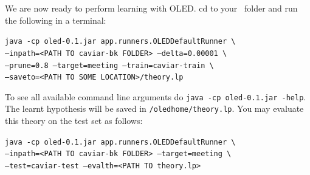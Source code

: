 \documentclass[a4paper,twoside,11pt]{article}
\theoremstyle{definition}
\begin{document}

We are now ready to perform learning with OLED. cd to your  \ folder and run the following in a terminal:

\noindent \texttt{java -cp oled-0.1.jar app.runners.OLEDDefaultRunner \textbackslash}\\
\texttt{--inpath=<PATH TO caviar-bk FOLDER> --delta=0.00001 \textbackslash}   \\
\texttt{--prune=0.8 --target=meeting --train=caviar-train \textbackslash}\\
\texttt{--saveto=<PATH TO SOME LOCATION>/theory.lp}

To see all available command line arguments do \texttt{java -cp oled-0.1.jar -help}. The learnt hypothesis will be saved in \texttt{/oledhome/theory.lp}. You may evaluate this theory on the test set as follows: 

\noindent \texttt{java -cp oled-0.1.jar app.runners.OLEDDefaultRunner \textbackslash}\\
\texttt{--inpath=<PATH TO caviar-bk FOLDER> --target=meeting \textbackslash}   \\
\texttt{--test=caviar-test --evalth=<PATH TO theory.lp>}


\newpage


\end{document}
